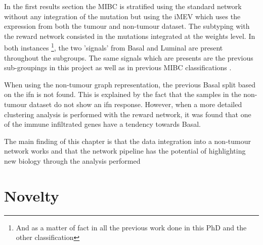 In the first results section the MIBC is stratified using the standard network without any integration of the mutation but using the iMEV which uses the expression from both the tumour and non-tumour dataset. The subtyping with the reward network consisted in the mutations integrated at the weights level. In both instances \footnote{And as a matter of fact in all the previous work done in this PhD and the other classification}, the two 'signals' from Basal and Luminal are present throughout the subgroups. The same signals which are presents are the previous sub-groupings in this project as well as in previous MIBC classifications \citet{Robertson2017-mg, Kamoun2020-tj, Marzouka2018-ge}.

When using the non-tumour graph representation, the previous Basal split based on the \acrfull{ifn} is not found. This is explained by the fact that the samples in the non-tumour dataset do not show an \acrshort{ifn} response. However, when a more detailed clustering analysis is performed with the reward network, it was found that one of the immune infiltrated genes have a tendency towards Basal.

The main finding of this chapter is that the data integration into a non-tumour network works and that the network pipeline has the potential of highlighting new biology through the analysis performed

\newpage

\section{Novelty}

